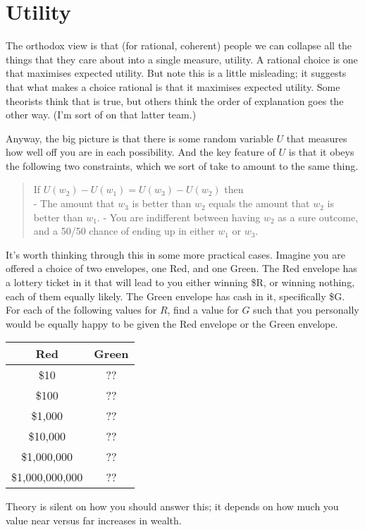 \documentclass[11pt,]{article}
\begin{document}
\hypertarget{utility}{%
\section{Utility}\label{utility}}

The orthodox view is that (for rational, coherent) people we can
collapse all the things that they care about into a single measure,
utility. A rational choice is one that maximises expected utility. But
note this is a little misleading; it suggests that what makes a choice
rational is that it maximises expected utility. Some theorists think
that is true, but others think the order of explanation goes the other
way. (I'm sort of on that latter team.)

Anyway, the big picture is that there is some random variable \(U\) that
measures how well off you are in each possibility. And the key feature
of \(U\) is that it obeys the following two constraints, which we sort
of take to amount to the same thing.

\begin{quote}
If \(U(w_2) - U(w_1) = U(w_3) - U(w_2)\) then\\
- The amount that \(w_3\) is better than \(w_2\) equals the amount that
\(w_2\) is better than \(w_1\). - You are indifferent between having
\(w_2\) as a sure outcome, and a 50/50 chance of ending up in either
\(w_1\) or \(w_3\).
\end{quote}

It's worth thinking through this in some more practical cases. Imagine
you are offered a choice of two envelopes, one Red, and one Green. The
Red envelope has a lottery ticket in it that will lead to you either
winning \$R, or winning nothing, each of them equally likely. The Green
envelope has cash in it, specifically \$G. For each of the following
values for \(R\), find a value for \(G\) such that you personally would
be equally happy to be given the Red envelope or the Green envelope.

\begin{longtable}[]{@{}cc@{}}
\toprule
Red & Green\tabularnewline
\midrule
\endhead
\$10 & ??\tabularnewline
\$100 & ??\tabularnewline
\$1,000 & ??\tabularnewline
\$10,000 & ??\tabularnewline
\$1,000,000 & ??\tabularnewline
\$1,000,000,000 & ??\tabularnewline
\bottomrule
\end{longtable}

Theory is silent on how you should answer this; it depends on how much
you value near versus far increases in wealth.
\end{document}
